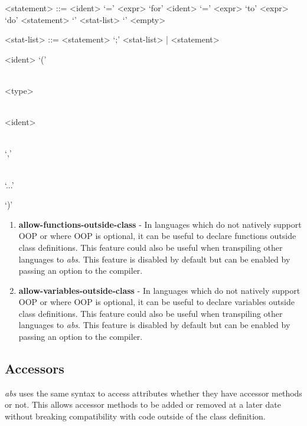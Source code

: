 \documentclass[hidelinks]{article}
\begin{document}
\begin{grammar}

<statement> ::= <ident> `=' <expr> 
\alt `for' <ident> `=' <expr> `to' <expr> `do' <statement> 
\alt `{' <stat-list> `}' 
\alt <empty> 

<stat-list> ::= <statement> `;' <stat-list> | <statement> 

\begin{syntdiag}<ident> ‘(’
	\begin{rep} \begin{stack} \\
		<type> \begin{stack} \\ <ident> \end{stack}
	\end{stack} \\ ‘,’ \end{rep}
\begin{stack} \\ ‘...’  \end{stack} ‘)’
\end{syntdiag}

\end{grammar}
\begin{enumerate}
\item \textbf{allow-functions-outside-class} - In languages which do not natively support OOP or where OOP is optional, it can be useful to declare functions outside class definitions. This feature could also be useful when transpiling other languages to \textit{abs}. This feature is disabled by default but can be enabled by passing an option to the compiler. 
\item \textbf{allow-variables-outside-class} - In languages which do not natively support OOP or where OOP is optional, it can be useful to declare variables outside class definitions. This feature could also be useful when transpiling other languages to \textit{abs}. This feature is disabled by default but can be enabled by passing an option to the compiler. 
\end{enumerate}
\subsection{Accessors}
\textit{abs} uses the same syntax to access attributes whether they have accessor methods or not. This allows accessor methods to be added or removed at a later date without breaking compatibility with code outside of the class definition.
\end{document}
